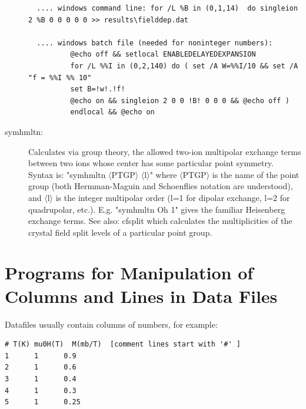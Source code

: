 \begin{description}
\begin{verbatim}
  .... windows command line: for /L %B in (0,1,14)  do singleion 2 %B 0 0 0 0 0 >> results\fielddep.dat

  .... windows batch file (needed for noninteger numbers):
          @echo off && setlocal ENABLEDELAYEDEXPANSION
          for /L %%I in (0,2,140) do ( set /A W=%%I/10 && set /A "f = %%I %% 10"
          set B=!w!.!f!
          @echo on && singleion 2 0 0 !B! 0 0 0 && @echo off )
          endlocal && @echo on 

\end{verbatim}      

\item [\prg symhmltn:] Calculates via group theory, the allowed two-ion multipolar exchange terms
between two ions whose center has some particular point symmetry. Syntax is: 
"{\prg symhmltn $\langle$PTGP$\rangle$ $\langle$l$\rangle$}" where {\prg $\langle$PTGP$\rangle$} is 
the name of the point group (both Hermman-Maguin and Schoenflies notation are understood), and 
{\prg $\langle$l$\rangle$} is the integer multipolar order (l=1 for dipolar exchange, l=2 for 
quadrupolar, etc.).
E.g. "{\prg symhmltn Oh 1}" gives the familiar Heisenberg exchange terms. 
See also: {\prg cfsplit} which calculates the multiplicities of the crystal field split levels of a
particular point group.

\end{description} 

\section{Programs for Manipulation of Columns and Lines in Data Files}

Datafiles usually contain columns of numbers, for example:

\begin{verbatim}
# T(K) mu0H(T)  M(mb/T)  [comment lines start with '#' ]
1      1      0.9
2      1      0.6
3      1      0.4
4      1      0.3
5      1      0.25
\end{verbatim}

